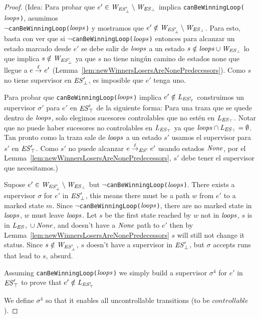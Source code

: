 \begin{proof}
	(Idea: Para probar que $e' \in \mathit{W_{\mathit{\mathit{ES}'_{\bot}}}} \setminus \mathit{W_{\mathit{\mathit{ES}_{\bot}}}}$ implica \texttt{canBeWinningLoop($\mathit{loops}$)}, asumimos \\ $\neg$\texttt{canBeWinningLoop($\mathit{loops}$)} y mostramos que $e' \notin \mathit{W_{\mathit{\mathit{ES}'_{\bot}}}} 
	\setminus \mathit{W_{\mathit{\mathit{ES}_{\bot}}}}$. Para esto, basta con ver que si
	$\neg$\texttt{canBeWinningLoop($\mathit{loops}$)} entonces para alcanzar un estado marcado desde $e'$ se debe salir de $\mathit{loops}$ a un estado $s \notin \mathit{loops} \cup \mathit{W_{\mathit{\mathit{ES}_{\bot}}}}$ lo que implica $s \notin \mathit{W_{\mathit{\mathit{ES}'_{\bot}}}}$ 
	ya que $s$ no tiene ningún camino de estados none que llegue a $e \overset{\ell}{\rightarrow}_{} e'$  (Lemma~\ref{lem:newWinnersLosersAreNonePredecessors}).
	Como $s$ no tiene supervisor en $\mathit{\mathit{ES}'_{\bot}}$, es imposible que $e'$ tenga uno. 
	
	Para probar que \texttt{canBeWinningLoop($\mathit{loops}$)} implica $e' \notin \mathit{L_{\mathit{\mathit{ES}'_{\top}}}}$ construimos un supervisor $\sigma'$ para $e'$ en $\mathit{\mathit{ES}'_{\top}}$ de la siguiente forma:
	Para una traza que se quede dentro de $\mathit{loops}$, solo elegimos sucesores controlables que no estén en $\mathit{L_{\mathit{\mathit{ES}_{\top}}}}$. Notar que no puede haber sucesores no controlables en $\mathit{L_{\mathit{\mathit{ES}_{\top}}}}$ ya que
	$\mathit{loops} \cap \mathit{L_{\mathit{\mathit{ES}_{\top}}}}= \emptyset$. Tan pronto como la traza sale de $\mathit{loops}$ a un estado $s'$ usamos el supervisor para $s'$ en $\mathit{\mathit{ES}'_{\top}}$. 
	Como $s'$ no puede alcanzar $e \overset{\ell}{\rightarrow}_{\mathit{ES}'} 
	e'$ usando estados $\mathit{None}$, por el 
	Lemma~\ref{lem:newWinnersLosersAreNonePredecessors}, $s'$ debe tener el supervisor que necesitamos.)	


Supose $e' \in \mathit{W_{\mathit{\mathit{ES}'_{\bot}}}} \setminus \mathit{W_{\mathit{\mathit{ES}_{\bot}}}}$ but $\neg$\texttt{canBeWinningLoop($\mathit{loops}$)}.
There exists a supervisor $\sigma$ for $e'$ in $\mathit{\mathit{ES}'_{\bot}}$, this means there must be a path $w$ from $e'$ to a marked state $m$. 
Since $\neg$\texttt{canBeWinningLoop($\mathit{loops}$)}, there are no marked state in $\mathit{loops}$, $w$ must leave $\mathit{loops}$. 
Let $s$ be the first state reached by $w$ not in $\mathit{loops}$, $s$ is in $\mathit{L_{\mathit{\mathit{ES}_{\top}}}} \cup \mathit{None}$, and doesn't have a $\mathit{None}$ path to $e'$ then by Lemma~\ref{lem:newWinnersLosersAreNonePredecessors} $s$ will still not change it status.
Since $s \notin \mathit{W_{\mathit{\mathit{ES}'_{\bot}}}}$, $s$ doesn't have a supervisor in $\mathit{\mathit{ES}'_{\bot}}$, but $\sigma$ accepts runs that lead to $s$, absurd.



Assuming \texttt{canBeWinningLoop($\mathit{loops}$)} we simply build a supervisor $\sigma^4$ for $e'$ in $\mathit{\mathit{ES}'_{\top}}$ to prove that $e' \notin \mathit{L_{\mathit{\mathit{ES}'_{\top}}}}$


We define $\sigma^4$ so that it enables all uncontrollable transitions (to be $controllable$).


\end{proof}
